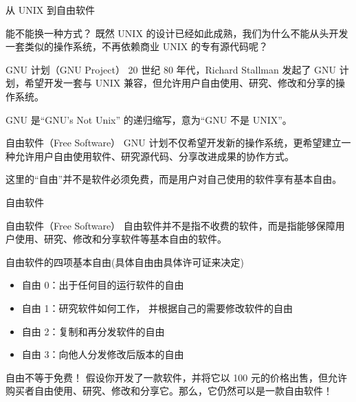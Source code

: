 \documentclass[aspectratio=169]{beamer}
\begin{document}
\begin{frame}{从 UNIX 到自由软件}
	
	\begin{block}{能不能换一种方式？}
		\hspace*{2em}既然 UNIX 的设计已经如此成熟，我们为什么不能从头开发一套类似的操作系统，不再依赖商业 UNIX 的专有源代码呢？	
	\end{block}
	
	\begin{block}{GNU 计划（GNU Project）}
		\hspace*{2em}20 世纪 80 年代，Richard Stallman 发起了 GNU 计划，希望开发一套与 UNIX 兼容，但允许用户自由使用、研究、修改和分享的操作系统。
		
		\par\hspace*{2em}GNU 是``GNU's Not Unix'' 的递归缩写，意为“GNU 不是 UNIX”。
	\end{block}
	
	\begin{block}{自由软件（Free Software）}
		\hspace*{2em}GNU 计划不仅希望开发新的操作系统，更希望建立一种允许用户自由使用软件、研究源代码、分享改进成果的协作方式。
		
		\par\hspace*{2em}\alert{这里的“自由”并不是软件必须免费，而是用户对自己使用的软件享有基本自由。}
	\end{block}
	
\end{frame}


\begin{frame}{自由软件}
	\begin{block}{自由软件（Free Software）}
		\hspace*{2em}自由软件并不是指不收费的软件，而是指能够保障用户使用、研究、修改和分享软件等基本自由的软件。
	\end{block}
	\begin{block}{自由软件的四项基本自由(具体自由由具体许可证来决定)}
		\begin{itemize}
			\item 自由 0：出于任何目的运行软件的自由
			\item 自由 1：研究软件如何工作，
			并根据自己的需要修改软件的自由
			\item 自由 2：复制和再分发软件的自由
			\item 自由 3：向他人分发修改后版本的自由
		\end{itemize}
	\end{block}
	\begin{block}{自由不等于免费！}
		\hspace*{2em}假设你开发了一款软件，并将它以 100 元的价格出售，但允许购买者自由使用、研究、修改和分享它。\alert{那么，它仍然可以是一款自由软件！}
	\end{block}
\end{frame}
\end{document}
